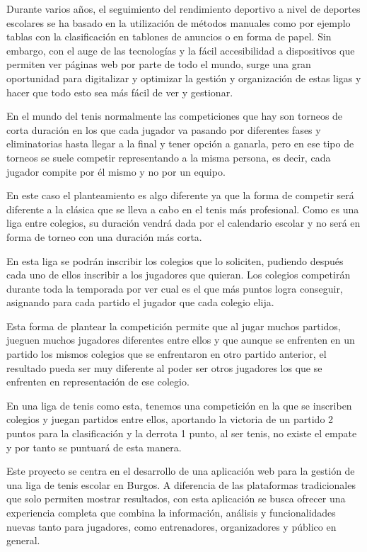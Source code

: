 
Durante varios años, el seguimiento del rendimiento deportivo a nivel de deportes escolares se ha basado en la utilización de métodos manuales como por ejemplo tablas con la clasificación en tablones de anuncios o en forma de papel. Sin embargo, con el auge de las tecnologías y la fácil accesibilidad a dispositivos que permiten ver páginas web por parte de todo el mundo, surge una gran oportunidad para digitalizar y optimizar la gestión y organización de estas ligas y hacer que todo esto sea más fácil de ver y gestionar.

En el mundo del tenis normalmente las competiciones que hay son torneos de corta duración en los que cada jugador va pasando por diferentes fases y eliminatorias hasta llegar a la final y tener opción a ganarla, pero en ese tipo de torneos se suele competir representando a la misma persona, es decir, cada jugador compite por él mismo y no por un equipo.

En este caso el planteamiento es algo diferente ya que la forma de competir será diferente a la clásica que se lleva a cabo en el tenis más profesional. Como es una liga entre colegios, su duración vendrá dada por el calendario escolar y no será en forma de torneo con una duración más corta. 

En esta liga se podrán inscribir los colegios que lo soliciten, pudiendo después cada uno de ellos inscribir a los jugadores que quieran. Los colegios competirán durante toda la temporada por ver cual es el que más puntos logra conseguir, asignando para cada partido el jugador que cada colegio elija.

Esta forma de plantear la competición permite que al jugar muchos partidos, jueguen muchos jugadores diferentes entre ellos y que aunque se enfrenten en un partido los mismos colegios que se enfrentaron en otro partido anterior, el resultado pueda ser muy diferente al poder ser otros jugadores los que se enfrenten en representación de ese colegio.

En una liga de tenis como esta, tenemos una competición en la que se inscriben colegios y juegan partidos entre ellos, aportando la victoria de un partido 2 puntos para la clasificación y la derrota 1 punto, al ser tenis, no existe el empate y por tanto se puntuará de esta manera.

Este proyecto se centra en el desarrollo de una aplicación web para la gestión de una liga de tenis escolar en Burgos. A diferencia de las plataformas tradicionales que solo permiten mostrar resultados, con esta aplicación se busca ofrecer una experiencia completa que combina la información, análisis y funcionalidades nuevas tanto para jugadores, como entrenadores, organizadores y público en general.

